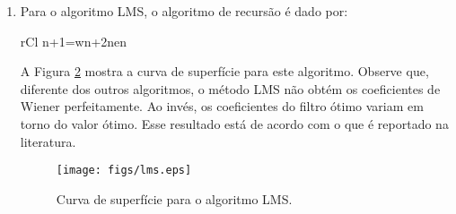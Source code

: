 \documentclass[12pt,a4paper]{article}
\begin{document}
\begin{enumerate}
\begin{enumerate}
\begin{enumerate}
	A Figura \ref{newton} mostra a curva de nível para este algoritmo.
	\begin{figure}[hbt]
		\centering
		\texttt{[image: figs/newton.eps]}
		\caption{Curva de nível para o algoritmo de Newton.}
		\label{newton}
	\end{figure}
	
	Observe que, diferentemente da Figura \ref{gradiente}, a curva de superfície do algoritmo de Newton forma uma única reta até o ponte de Wiener. Isso se dá porque este algoritmo, por ser de segunda ordem, busca o caminho de minimiza a função custo em uma concavidade, enquanto que o gradiente busca em um plano. Como a função custo é quadrática, a curva de nível que vemos no algoritmo de Newton é um único segmento que nos leva até o ponto ótimo (após algumas iterações).
	
	\item
	
	Para o algoritmo LMS, o algoritmo de recursão é dado por:
	\begin{IEEEeqnarray}{rCl}
	\left\lbrack n+1\right\rbrack =w\left\lbrack n\right\rbrack +2\mu {}\left\lbrack n\right\rbrack e\left\lbrack n\right\rbrack
	\end{IEEEeqnarray}
	
	A Figura \ref{lms} mostra a curva de superfície para este algoritmo. Observe que, diferente dos outros algoritmos, o método LMS não obtém os coeficientes de Wiener perfeitamente. Ao invés, os coeficientes do filtro ótimo variam em torno do valor ótimo. Esse resultado está de acordo com o que é reportado na literatura.
	
	\begin{figure}[hbt]
	\centering
	\texttt{[image: figs/lms.eps]}
	\caption{Curva de superfície para o algoritmo LMS.}
	\label{lms}
	\end{figure}
	
	\end{enumerate}
\end{enumerate}
\end{enumerate}



\end{document}
